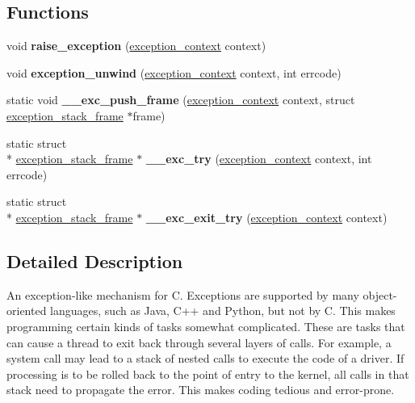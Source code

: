 \subsection*{Functions}
\begin{DoxyCompactItemize}
\item 
\hypertarget{group__exceptions_ga7eda2653ee54e0c95e9d51b8fd873298}{void {\bfseries raise\-\_\-exception} (\hyperlink{structexception__stack__frame}{exception\-\_\-context} context)}\label{group__exceptions_ga7eda2653ee54e0c95e9d51b8fd873298}

\item 
\hypertarget{group__exceptions_ga5232fee2c414c5ff1ff44dc28c83cf42}{void {\bfseries exception\-\_\-unwind} (\hyperlink{structexception__stack__frame}{exception\-\_\-context} context, int errcode)}\label{group__exceptions_ga5232fee2c414c5ff1ff44dc28c83cf42}

\item 
\hypertarget{group__exceptions_gad0ebd2587ae85b044e1306a026246a27}{static void {\bfseries \-\_\-\-\_\-exc\-\_\-push\-\_\-frame} (\hyperlink{structexception__stack__frame}{exception\-\_\-context} context, struct \hyperlink{structexception__stack__frame}{exception\-\_\-stack\-\_\-frame} $\ast$frame)}\label{group__exceptions_gad0ebd2587ae85b044e1306a026246a27}

\item 
\hypertarget{group__exceptions_ga47cfe7a060b16ac1cd9a4432853205dc}{static struct \\*
\hyperlink{structexception__stack__frame}{exception\-\_\-stack\-\_\-frame} $\ast$ {\bfseries \-\_\-\-\_\-exc\-\_\-try} (\hyperlink{structexception__stack__frame}{exception\-\_\-context} context, int errcode)}\label{group__exceptions_ga47cfe7a060b16ac1cd9a4432853205dc}

\item 
\hypertarget{group__exceptions_ga9d85149bdb927245ff694068119412df}{static struct \\*
\hyperlink{structexception__stack__frame}{exception\-\_\-stack\-\_\-frame} $\ast$ {\bfseries \-\_\-\-\_\-exc\-\_\-exit\-\_\-try} (\hyperlink{structexception__stack__frame}{exception\-\_\-context} context)}\label{group__exceptions_ga9d85149bdb927245ff694068119412df}

\end{DoxyCompactItemize}


\subsection{Detailed Description}
An exception-\/like mechanism for C. Exceptions are supported by many object-\/oriented languages, such as Java, C++ and Python, but not by C. This makes programming certain kinds of tasks somewhat complicated. These are tasks that can cause a thread to exit back through several layers of calls. For example, a system call may lead to a stack of nested calls to execute the code of a driver. If processing is to be rolled back to the point of entry to the kernel, all calls in that stack need to propagate the error. This makes coding tedious and error-\/prone.

